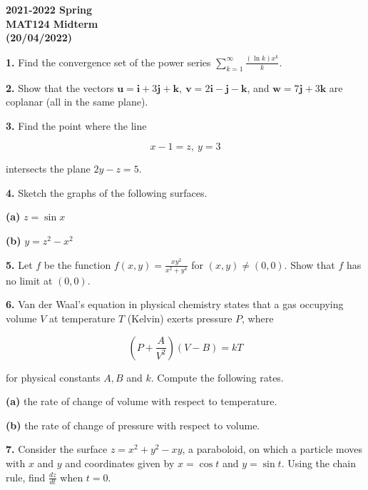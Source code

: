 \documentclass{article}
\begin{document}
\pagestyle{empty}
\large

\begin{center}
\textbf{2021-2022 Spring \\MAT124 Midterm\\(20/04/2022)}
\end{center}

\textbf{1.} Find the convergence set of the power series $\displaystyle\sum_{k=1}^\infty\frac{(\ln k)x^k}k$.

\vspace{1em}

\textbf{2.} Show that the vectors $\mathbf{u}=\mathbf{i}+3\mathbf{j}+\mathbf{k},\:\mathbf{v}=2\mathbf{i}-\mathbf{j}-\mathbf{k}$, and $\mathbf{w}=7\mathbf{j}+3\mathbf{k}$ are coplanar (all in the same plane).

\vspace{1em}

\textbf{3.} Find the point where the line

\[x-1=z,\:y=3\]

intersects the plane $2y-z=5$.

\vspace{1em}

\textbf{4.} Sketch the graphs of the following surfaces.

\textbf{(a)} $z=\sin x$

\textbf{(b)} $y=z^2-x^2$

\vspace{1em}

\textbf{5.} Let $f$ be the function $\displaystyle f(x,y)=\frac{xy^2}{x^2+y^4}$ for $(x,y)\neq(0,0)$. Show that $f$ has no limit at $(0,0)$.

\vspace{1em}

\textbf{6.} Van der Waal's equation in physical chemistry states that a gas occupying volume $V$ at temperature $T$ (Kelvin) exerts pressure $P$, where

\[\left(P+\frac A{V^2}\right)(V-B)=kT\]

for physical constants $A, B$ and $k$. Compute the following rates.

\textbf{(a)} the rate of change of volume with respect to temperature.

\textbf{(b)} the rate of change of pressure with respect to volume.

\vspace{1em}

\textbf{7.} Consider the surface $z=x^2+y^2-xy$, a paraboloid, on which a particle moves with $x$ and $y$ and coordinates given by $x=\cos t$ and $y=\sin t$. Using the chain rule, find $\displaystyle\frac{dz}{dt}$ when $t=0$. 
\end{document}
